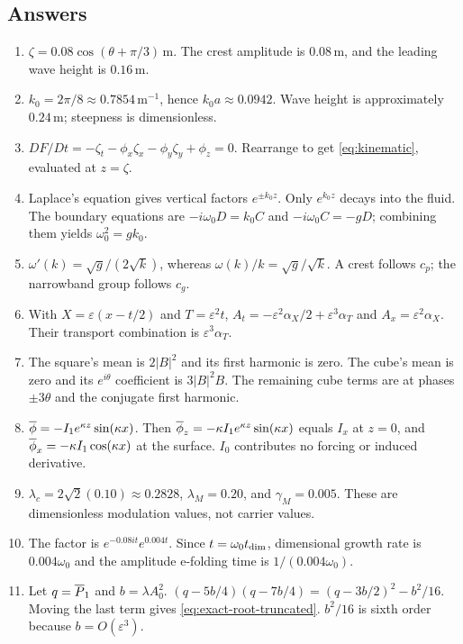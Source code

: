 \subsection{Answers}
\begin{enumerate}[label=\textbf{\arabic*.}]
\item $\zeta=0.08\cos(\theta+\pi/3)\,\mathrm{m}$. The crest amplitude
is $0.08\,\mathrm{m}$, and the leading wave height is $0.16\,\mathrm{m}$.
\item $k_0=2\pi/8\approx0.7854\,\mathrm{m}^{-1}$, hence
$k_0a\approx0.0942$. Wave height is approximately $0.24\,\mathrm{m}$;
steepness is dimensionless.
\item $DF/Dt=-\zeta_t-\phi_x\zeta_x-\phi_y\zeta_y+\phi_z=0$.
Rearrange to get \eqref{eq:kinematic}, evaluated at $z=\zeta$.
\item Laplace's equation gives vertical factors $e^{\pm k_0z}$.
Only $e^{k_0z}$ decays into the fluid. The boundary equations are
$-i\omega_0D=k_0C$ and $-i\omega_0C=-gD$; combining them yields
$\omega_0^2=gk_0$.
\item $\omega'(k)=\sqrt{g}/(2\sqrt{k})$, whereas
$\omega(k)/k=\sqrt{g}/\sqrt{k}$. A crest follows $c_p$;
the narrowband group follows $c_g$.
\item With $X=\varepsilon(x-t/2)$ and $T=\varepsilon^2t$,
$A_t=-\varepsilon^2\alpha_X/2+\varepsilon^3\alpha_T$ and
$A_x=\varepsilon^2\alpha_X$. Their transport combination is
$\varepsilon^3\alpha_T$.
\item The square's mean is $2|B|^2$ and its first harmonic is zero.
The cube's mean is zero and its $e^{i\theta}$ coefficient is $3|B|^2B$.
The remaining cube terms are at phases $\pm3\theta$ and the conjugate
first harmonic.
\item $\overline{\phi}=-I_1e^{\kappa z}\sin(\kappa x)$.
Then $\overline{\phi}_z=-\kappa I_1e^{\kappa z}\sin(\kappa x)$ equals $I_x$
at $z=0$, and $\overline{\phi}_x=-\kappa I_1\cos(\kappa x)$ at the surface.
$I_0$ contributes no forcing or induced derivative.
\item $\lambda_c=2\sqrt2(0.10)\approx0.2828$,
$\lambda_M=0.20$, and $\gamma_M=0.005$.
These are dimensionless modulation values, not carrier values.
\item The factor is $e^{-0.08it}e^{0.004t}$.
Since $t=\omega_0t_{\rm dim}$, dimensional growth rate is
$0.004\omega_0$ and the amplitude e-folding time is
$1/(0.004\omega_0)$.
\item Let $q=\overline{P}_1$ and $b=\lambda A_0^2$.
$(q-5b/4)(q-7b/4)=(q-3b/2)^2-b^2/16$.
Moving the last term gives \eqref{eq:exact-root-truncated}.
$b^2/16$ is sixth order because $b=O(\varepsilon^3)$.

\end{enumerate}
